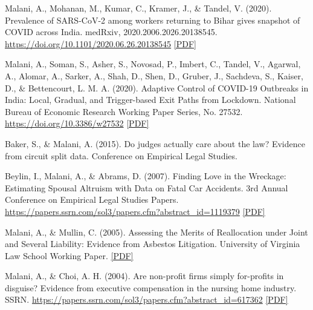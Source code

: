 \begin{tablist}
        \item[2020] \tab{}Malani, A., Mohanan, M., Kumar, C., Kramer, J., \& Tandel, V. (2020). Prevalence of SARS-CoV-2 among workers returning to Bihar gives snapshot of COVID across India. medRxiv, 2020.2006.2026.20138545. \href{https://doi.org/10.1101/2020.06.26.20138545}{https://doi.org/10.1101/2020.06.26.20138545} \href{https://github.com/anup-malani/website_personal/blob/main/publications/2020_Malani_Medrxiv_BiharCOVIDPrevalence.pdf}{[PDF]}

        \item[2020] \tab{}Malani, A., Soman, S., Asher, S., Novosad, P., Imbert, C., Tandel, V., Agarwal, A., Alomar, A., Sarker, A., Shah, D., Shen, D., Gruber, J., Sachdeva, S., Kaiser, D., \& Bettencourt, L. M. A. (2020). Adaptive Control of COVID-19 Outbreaks in India: Local, Gradual, and Trigger-based Exit Paths from Lockdown. National Bureau of Economic Research Working Paper Series, No. 27532. \href{https://doi.org/10.3386/w27532}{https://doi.org/10.3386/w27532} \href{https://github.com/anup-malani/website_personal/blob/main/publications/2020_Malani_NBERw27532_AdaptiveControlCOVID.pdf}{[PDF]}
        
        \item[2015] \tab{}Baker, S., \& Malani, A. (2015). Do judges actually care about the law? Evidence from circuit split data. Conference on Empirical Legal Studies.  

        \item[2007] \tab{}Beylin, I., Malani, A., \& Abrams, D. (2007). Finding Love in the Wreckage: Estimating Spousal Altruism with Data on Fatal Car Accidents. 3rd Annual Conference on Empirical Legal Studies Papers.  \href{https://papers.ssrn.com/sol3/papers.cfm?abstract_id=1119379}{https://papers.ssrn.com/sol3/papers.cfm?abstract\_id=1119379} \href{https://github.com/anup-malani/website_personal/blob/main/publications/2007_BeylinMalani_LovWreckage.pdf}{[PDF]} 

        \item[2005] \tab{}Malani, A., \& Mullin, C. (2005). Assessing the Merits of Reallocation under Joint and Several Liability: Evidence from Asbestos Litigation. University of Virginia Law School Working Paper. \href{https://github.com/anup-malani/website_personal/blob/main/publications/2005_MalaniMullin_WP_ReallocationJointSeveral.pdf}{[PDF]} 

        \item[2004] \tab{}Malani, A., \& Choi, A. H. (2004). Are non-profit firms simply for-profits in disguise? Evidence from executive compensation in the nursing home industry. SSRN. \href{https://papers.ssrn.com/sol3/papers.cfm?abstract_id=617362}{https://papers.ssrn.com/sol3/papers.cfm?abstract\_id=617362} \href{https://github.com/anup-malani/website_personal/blob/main/publications/2004_MalaniChoi_NonProfitNursingHome.pdf}{[PDF]} 


\end{tablist}
